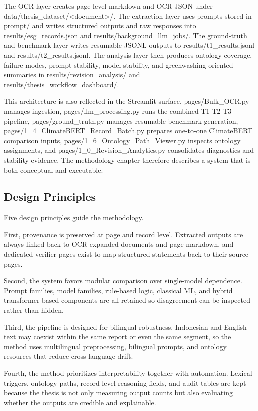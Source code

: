 The OCR layer creates page-level markdown and OCR JSON under data/thesis\_dataset/<document>/. The extraction layer uses prompts stored in prompt/ and writes structured outputs and raw responses into results/esg\_records.json and results/background\_llm\_jobs/. The ground-truth and benchmark layer writes resumable JSONL outputs to results/t1\_results.jsonl and results/t2\_results.jsonl. The analysis layer then produces ontology coverage, failure modes, prompt stability, model stability, and greenwashing-oriented summaries in results/revision\_analysis/ and results/thesis\_workflow\_dashboard/.

This architecture is also reflected in the Streamlit surface. pages/Bulk\_OCR.py manages ingestion, pages/llm\_processing.py runs the combined T1-T2-T3 pipeline, pages/ground\_truth.py manages resumable benchmark generation, pages/1\_4\_ClimateBERT\_Record\_Batch.py prepares one-to-one ClimateBERT comparison inputs, pages/1\_6\_Ontology\_Path\_Viewer.py inspects ontology assignments, and pages/1\_0\_Revision\_Analytics.py consolidates diagnostics and stability evidence. The methodology chapter therefore describes a system that is both conceptual and executable.

\subsection{Design Principles}

Five design principles guide the methodology.

First, provenance is preserved at page and record level. Extracted outputs are always linked back to OCR-expanded documents and page markdown, and dedicated verifier pages exist to map structured statements back to their source pages.

Second, the system favors modular comparison over single-model dependence. Prompt families, model families, rule-based logic, classical ML, and hybrid transformer-based components are all retained so disagreement can be inspected rather than hidden.

Third, the pipeline is designed for bilingual robustness. Indonesian and English text may coexist within the same report or even the same segment, so the method uses multilingual preprocessing, bilingual prompts, and ontology resources that reduce cross-language drift.

Fourth, the method prioritizes interpretability together with automation. Lexical triggers, ontology paths, record-level reasoning fields, and audit tables are kept because the thesis is not only measuring output counts but also evaluating whether the outputs are credible and explainable.


